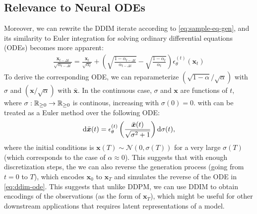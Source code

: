 \subsection{Relevance to Neural ODEs}
Moreover, we can rewrite the DDIM iterate according to \eqref{eq:sample-eq-gen}, and its similarity to Euler integration for solving ordinary differential equations (ODEs) becomes more apparent:
\begin{align}
    \frac{\bm{x}_{t-\Delta t}}{\sqrt{\alpha_{t-\Delta t}}}  = \frac{\bm{x}_t}{\sqrt{\alpha_t}}  + \left(\sqrt{\frac{1 - \alpha_{t-\Delta t}}{\alpha_{t-\Delta t}}} - \sqrt{\frac{1 - \alpha_{t}}{\alpha_t}}\right) \epsilon_\theta^{(t)}(\bm{x}_t) \label{eq:ddim-euler}
\end{align}
To derive the corresponding ODE, we can reparameterize $(\sqrt{1 - \alpha} / \sqrt{\alpha})$ with $\sigma$ and $(\bm{x} / \sqrt{\alpha})$ with $\bar{\bm{x}}$. In the continuous case, $\sigma$ and $\bm{x}$ are functions of $t$, where $\sigma: {\mathbb{R}}_{\geq 0} \to {\mathbb{R}}_{\geq 0}$ is continous, increasing with $\sigma(0) = 0$.
 with can be treated as a Euler method over the following ODE:
\begin{align}
   \mathrm{d} \bar{\bm{x}}(t) = \epsilon_\theta^{(t)}\left(\frac{\bar{\bm{x}}(t)}{\sqrt{\sigma^2 + 1}}\right) \mathrm{d} \sigma(t) \label{eq:ddim-ode},
\end{align}
where the initial conditions is $\bm{x}(T) \sim \mathcal{N}(0, \sigma(T))$ for a very large $\sigma(T)$ (which corresponds to the case of $\alpha \approx 0$). This suggests that with enough discretization steps, the we can also reverse the generation process (going from $t = 0$ to $T$), which encodes $\bm{x}_0$ to $\bm{x}_T$ and simulates the reverse of the ODE in \eqref{eq:ddim-ode}. This suggests that unlike DDPM, we can use DDIM to obtain encodings of the observations (as the form of $\bm{x}_T$), which might be useful for other downstream applications that requires latent representations of a model.

